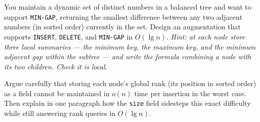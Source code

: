 \begin{exercise}
You maintain a dynamic set of distinct numbers in a balanced tree and want to
support \texttt{MIN-GAP}, returning the smallest difference between any two
adjacent numbers (in sorted order) currently in the set. Design an augmentation
that supports \texttt{INSERT}, \texttt{DELETE}, and \texttt{MIN-GAP} in
$O(\lg n)$. \emph{Hint: at each node store three local summaries --- the minimum
key, the maximum key, and the minimum adjacent gap within the subtree --- and write
the formula combining a node with its two children. Check it is local.}
\end{exercise}

\begin{exercise}
Argue carefully that storing each node's global rank (its position in sorted
order) as a field cannot be maintained in $o(n)$ time per insertion in the worst
case. Then explain in one paragraph how the \texttt{size} field sidesteps this
exact difficulty while still answering rank queries in $O(\lg n)$.
\end{exercise}
